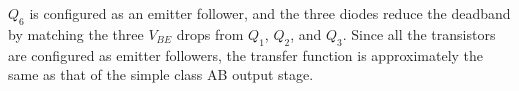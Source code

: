 $Q_6$ is configured as an emitter follower, and the three diodes reduce the deadband by matching the three $V_{BE}$ drops from $Q_1$, $Q_2$, and $Q_3$.
Since all the transistors are configured as emitter followers, the transfer function is approximately the same as that of the simple class AB output stage.

